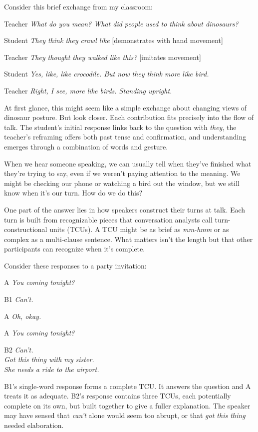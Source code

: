 Consider this brief exchange from my classroom:

\ea
\begin{dialogue}
\item[Teacher] \textit{What do you mean? What did people used to think about dinosaurs?}
\item[Student] \textit{They think they crawl like} [demonstrates with hand movement]
\item[Teacher] \textit{They thought they walked like this?} [imitates movement]
\item[Student] \textit{Yes, like, like crocodile. But now they think more like bird.}
\item[Teacher] \textit{Right, I see, more like birds. Standing upright.}
\end{dialogue}
\z
At first glance, this might seem like a simple exchange about changing views of dinosaur posture. But look closer. Each contribution fits precisely into the flow of talk. The student's initial response links back to the question with \textit{they}, the teacher's reframing offers both past tense and confirmation, and understanding emerges through a combination of words and gesture.

When we hear someone speaking, we can usually tell when they've finished what they're trying to say, even if we weren't paying attention to the meaning. We might be checking our phone or watching a bird out the window, but we still know when it's our turn. How do we do this?

One part of the answer lies in how speakers construct their turns at talk. Each turn is built from recognizable pieces that conversation analysts call turn-constructional units (TCUs). A TCU might be as brief as \textit{mm-hmm} or as complex as a multi-clause sentence. What matters isn't the length but that other participants can recognize when it's complete.

Consider these responses to a party invitation:

\ea
\begin{dialogue}
\item[A] \textit{You coming tonight?}
\item[B1] \textit{Can't.}
\item[A] \textit{Oh, okay.}
\end{dialogue}
\z

\ea
\begin{dialogue}
\item[A] \textit{You coming tonight?}
\item[B2] \textit{Can't.} \\
   \textit{Got this thing with my sister.} \\
   \textit{She needs a ride to the airport.}
\end{dialogue}
\z
B1's single-word response forms a complete TCU. It answers the question and A treats it as adequate. B2's response contains three TCUs, each potentially complete on its own, but built together to give a fuller explanation. The speaker may have sensed that \textit{can't} alone would seem too abrupt, or that \textit{got this thing} needed elaboration.

